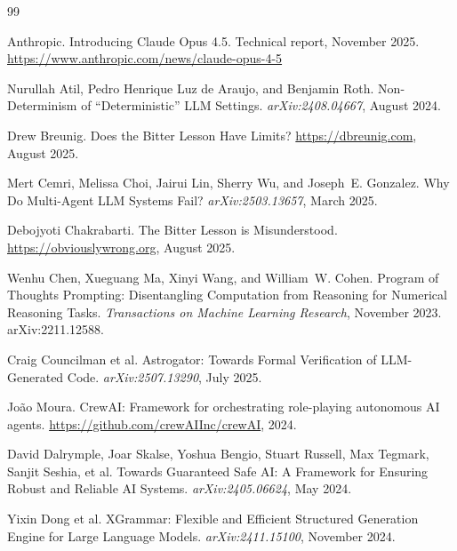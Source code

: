 \documentclass[11pt]{article}
\begin{document}
\begin{thebibliography}{99}

Anthropic.
\newblock Introducing Claude Opus 4.5.
\newblock Technical report, November 2025.
\newblock \url{https://www.anthropic.com/news/claude-opus-4-5}

Nurullah Atil, Pedro Henrique Luz de Araujo, and Benjamin Roth.
\newblock Non-Determinism of ``Deterministic'' LLM Settings.
\newblock \emph{arXiv:2408.04667}, August 2024.

Drew Breunig.
\newblock Does the Bitter Lesson Have Limits?
\newblock \url{https://dbreunig.com}, August 2025.

Mert Cemri, Melissa Choi, Jairui Lin, Sherry Wu, and Joseph~E. Gonzalez.
\newblock Why Do Multi-Agent LLM Systems Fail?
\newblock \emph{arXiv:2503.13657}, March 2025.

Debojyoti Chakrabarti.
\newblock The Bitter Lesson is Misunderstood.
\newblock \url{https://obviouslywrong.org}, August 2025.

Wenhu Chen, Xueguang Ma, Xinyi Wang, and William~W. Cohen.
\newblock Program of Thoughts Prompting: Disentangling Computation from Reasoning for Numerical Reasoning Tasks.
\newblock \emph{Transactions on Machine Learning Research}, November 2023.
\newblock arXiv:2211.12588.

Craig Councilman et al.
\newblock Astrogator: Towards Formal Verification of LLM-Generated Code.
\newblock \emph{arXiv:2507.13290}, July 2025.

Jo\~{a}o Moura.
\newblock CrewAI: Framework for orchestrating role-playing autonomous AI agents.
\newblock \url{https://github.com/crewAIInc/crewAI}, 2024.

David Dalrymple, Joar Skalse, Yoshua Bengio, Stuart Russell, Max Tegmark, Sanjit Seshia, et al.
\newblock Towards Guaranteed Safe AI: A Framework for Ensuring Robust and Reliable AI Systems.
\newblock \emph{arXiv:2405.06624}, May 2024.

Yixin Dong et al.
\newblock XGrammar: Flexible and Efficient Structured Generation Engine for Large Language Models.
\newblock \emph{arXiv:2411.15100}, November 2024.


\end{thebibliography}
\end{document}
